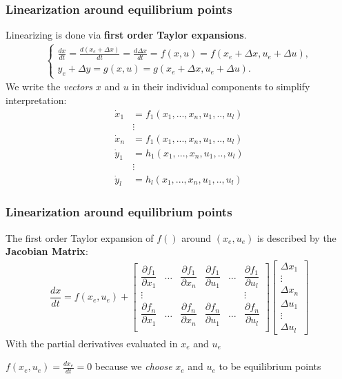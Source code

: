 \begin{frame}
	\frametitle{Linearization around equilibrium points}
	Linearizing is done via \textbf{first order Taylor expansions}.
	\begin{align*}
	\left\{ \begin{matrix}
	\frac{dx}{dt} = \frac{d (x_e + \Delta x)}{dt} = \frac{d \Delta x}{dt} = f(x,u) = f(x_e+\Delta x, u_e + \Delta u), \\
	y_e + \Delta y = g(x, u) = g(x_e + \Delta x, u_e + \Delta u).
	\end{matrix}\right.
	\end{align*}
	We write the \emph{vectors} $x$ and $u$ in their individual components to simplify interpretation:
	\begin{align*}
		\dot{x}_1 &= f_1(x_1, ..., x_n, u_1, .., u_l) \\
			&\vdots \\
		\dot{x}_n &= f_1(x_1, ..., x_n, u_1, .., u_l) \\
		\dot{y}_1 &= h_1(x_1, ..., x_n, u_1, .., u_l) \\
			&\vdots \\
		\dot{y}_l &= h_l(x_1, ..., x_n, u_1, .., u_l) 
	\end{align*}
\end{frame}

\begin{frame}
	\frametitle{Linearization around equilibrium points}
	The first order Taylor expansion of $f()$ around $(x_e,u_e)$ is described by the \textbf{Jacobian Matrix}:
	\begin{align*}
		\dfrac{dx}{dt} = f(x_e,u_e) +
					\begin{bmatrix}
						\dfrac{\partial f_1}{\partial x_1} 	&\dots 	&\dfrac{\partial f_1}{\partial x_n} 	&\dfrac{\partial f_1}{\partial u_1} 	&\dots 	&\dfrac{\partial f_1}{\partial u_l} \\
						\vdots 						&		&							&					&		&\vdots  \\
						\dfrac{\partial f_n}{\partial x_1} 	&\dots 	&\dfrac{\partial f_n}{\partial x_n} 	&\dfrac{\partial f_n}{\partial u_1} 	&\dots 	&\dfrac{\partial f_n}{\partial u_l} \\
					\end{bmatrix}
					\begin{bmatrix}
						\Delta x_1 \\
						\vdots \\
						\Delta x_n \\
						\Delta u_1 \\
						\vdots \\
						\Delta u_l
					\end{bmatrix}
	\end{align*}
	With the partial derivatives evaluated in $x_e$ and $u_e$
	
	$f(x_e,u_e)=\frac{dx_e}{dt} = 0$ because we \emph{choose} $x_e$ and $u_e$ to be equilibrium points 
\end{frame}

